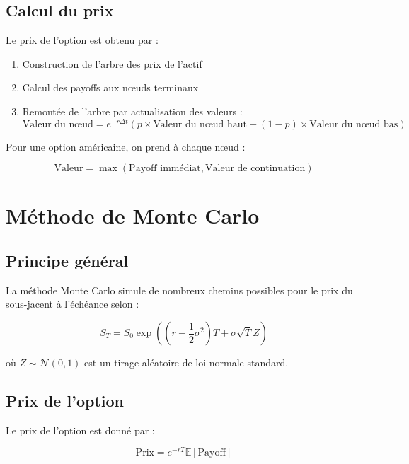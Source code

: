 \documentclass{article}
\begin{document}
\subsection{Calcul du prix}

Le prix de l'option est obtenu par :

\begin{enumerate}
    \item Construction de l'arbre des prix de l'actif
    \item Calcul des payoffs aux nœuds terminaux
    \item Remontée de l'arbre par actualisation des valeurs :
    \begin{equation}
    \text{Valeur du nœud} = e^{-r \Delta t} (p \times \text{Valeur du nœud haut} + (1-p) \times \text{Valeur du nœud bas})
    \end{equation}
\end{enumerate}

Pour une option américaine, on prend à chaque nœud :

\[
\text{Valeur} = \max(\text{Payoff immédiat}, \text{Valeur de continuation})
\]

\section{Méthode de Monte Carlo}

\subsection{Principe général}

La méthode Monte Carlo simule de nombreux chemins possibles pour le prix du sous-jacent à l'échéance selon :

\begin{equation}
S_T = S_0 \exp\left( \left(r - \frac{1}{2}\sigma^2\right)T + \sigma \sqrt{T} Z \right)
\end{equation}

où \( Z \sim \mathcal{N}(0,1) \) est un tirage aléatoire de loi normale standard.

\subsection{Prix de l'option}

Le prix de l'option est donné par :

\begin{equation}
\text{Prix} = e^{-rT} \mathbb{E}[\text{Payoff}]
\end{equation}
\end{document}
